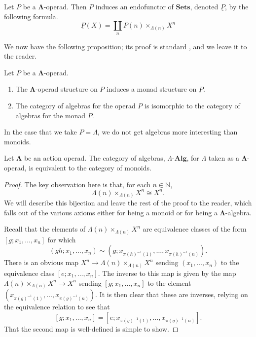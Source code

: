 \documentclass{amsbook} %
\newcommand{\mb}{\mathbf}
\newcommand{\ML}{\mathbf{\Lambda}}
\numberwithin{section}{chapter}
\begin{document}
\begin{Defi}
Let $P$ be a $\ML$-operad.  Then $P$ induces an endofunctor of $\mb{Sets}$, denoted $\underline{P}$, by the following formula.
 \[
	\underline{P}(X)	 =  \coprod_n P(n) \times_{\Lambda(n)} X^n
\]
\end{Defi}

We now have the following proposition; its proof is standard \cite{maygeom}, and we leave it to the reader.

\begin{prop}\label{op=monad1}  Let $P$ be a $\ML$-operad.
\begin{enumerate}
\item The $\ML$-operad structure on $P$ induces a monad structure on $\underbar{P}$.
\item The category of algebras for the operad $P$ is isomorphic to the category of algebras for the monad $\underbar{P}$.
\end{enumerate}
\end{prop}

In the case that we take $P = \Lambda$, we do not get algebras more interesting than monoids.
\begin{prop}
Let $\ML$ be an action operad. The category of algebras, $\Lambda\mbox{-}\mb{Alg}$, for $\Lambda$ taken as a $\ML$-operad, is equivalent to the category of monoids.
\end{prop}
\begin{proof}
The key observation here is that, for each $n \in \mathbb{N}$,
	\[
		\Lambda(n) \times_{\Lambda(n)} X^n \cong X^n.
	\]
We will describe this bijection and leave the rest of the proof to the reader, which falls out of the various axioms either for being a monoid or for being a $\ML$-algebra.

Recall that the elements of $\Lambda(n) \times_{\Lambda(n)} X^n$ are equivalence classes of the form $[g ; x_1, \ldots, x_n]$ for which
	\[
		(gh; x_1, \ldots, x_n) \sim (g; x_{\pi(h)^{-1}(1)}, \ldots, x_{\pi(h)^{-1}(n)}).
	\]
There is an obvious map $X^n \rightarrow \Lambda(n) \times_{\Lambda(n)} X^n$ sending $(x_1, \ldots, x_n)$ to the equivalence class $[e; x_1, \ldots, x_n]$. The inverse to this map is given by the map $\Lambda(n) \times_{\Lambda(n)} X^n \rightarrow X^n$ sending $[g;x_1,\ldots,x_n]$ to the element $(x_{\pi(g)^{-1}(1)},\ldots,x_{\pi(g)^{-1}(n)})$. It is then clear that these are inverses, relying on the equivalence relation to see that
	\[
		[g;x_1,\ldots,x_n] = [e;x_{\pi(g)^{-1}(1)},\ldots,x_{\pi(g)^{-1}(n)}].
	\]
That the second map is well-defined is simple to show.
\end{proof}
\end{document}
